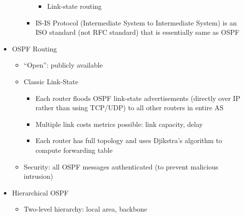 \begin{itemize}
\begin{itemize}
\begin{itemize}
            \begin{itemize}

              \item Link-state routing

            \end{itemize}

          \item IS-IS Protocol (Intermediate System to Intermediate System) is an ISO standard (not RFC standard) that is essentially same as OSPF

        \end{itemize}

    \end{itemize}

  \item OSPF Routing

    \begin{itemize}

      \item ``Open'': publicly available

      \item Classic Link-State

        \begin{itemize}

          \item Each router floods OSPF link-state advertisements (directly over IP rather than using TCP/UDP) to all other routers in entire AS

          \item Multiple link costs metrics possible: link capacity, delay

          \item Each router has full topology and uses Djikstra's algorithm to compute forwarding table

        \end{itemize}

      \item Security: all OSPF messages authenticated (to prevent malicious intrusion)

    \end{itemize}

  \item Hierarchical OSPF

    \begin{itemize}

      \item Two-level hierarchy: local area, backbone

        \begin{itemize}


\end{itemize}
\end{itemize}
\end{itemize}
